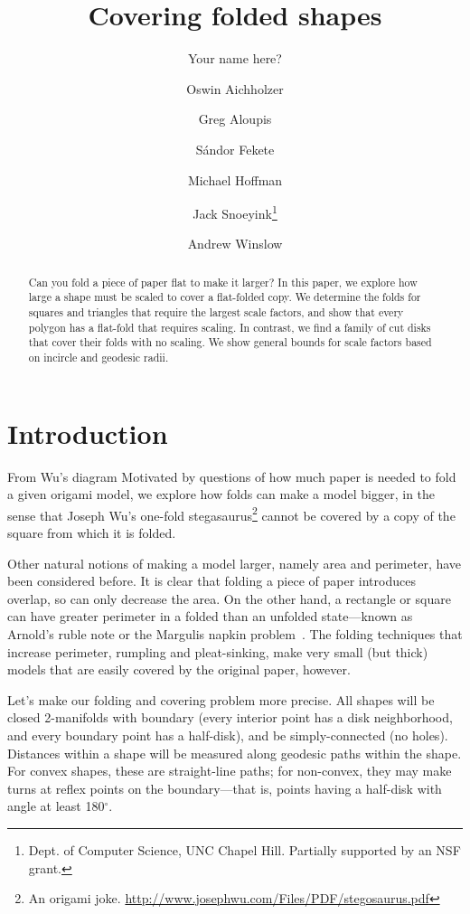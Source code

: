 \documentclass[11pt]{article}
\title{Covering folded shapes}
\author{
Your name here?\and
Oswin Aichholzer\and
Greg Aloupis\and
S\'andor Fekete\and
Michael Hoffman\and
Jack Snoeyink\thanks{
Dept. of Computer Science, UNC Chapel Hill. Partially supported by an
NSF grant.}\and
Andrew Winslow
}
\begin{document}
\maketitle
\begin{abstract}
Can you fold a piece of paper flat to make it larger? 
In this paper, we explore how large a shape must be scaled to cover a 
flat-folded copy.  We determine the folds for squares and triangles that require the
largest scale factors, and show that every polygon has a flat-fold that
requires scaling.  In contrast, we  find a
family of cut disks that cover their folds with no scaling. 
We show general bounds for scale factors based on incircle and geodesic radii.
\end{abstract}
\section{Introduction}

{From Wu's diagram}
Motivated by questions of how much paper is needed to fold a given origami model, 
we explore how folds can make a model bigger, in the sense that 
Joseph Wu's one-fold stegasaurus\footnote{An origami joke. 
\url{http://www.josephwu.com/Files/PDF/stegosaurus.pdf}}
cannot be covered by a copy of the square from which it is folded.

Other natural notions of making a model larger, namely area and perimeter,  
have been considered before.
It is clear that folding a piece of paper introduces overlap, so can
only decrease the area.  On the other hand, a rectangle or square can
have greater perimeter in a folded than an unfolded state---known 
as Arnold's ruble note or the Margulis napkin problem~\cite{a05,l03}. 
The folding techniques that increase perimeter, rumpling and
pleat-sinking, make very small (but thick)  models that are easily
covered by the original paper, however. 

Let's make our folding and covering problem more precise. 
All shapes will be closed 2-manifolds with
boundary (every interior point has a disk neighborhood, and every
boundary point has a half-disk), and be simply-connected (no holes). 
Distances within a shape will be measured along geodesic paths
within the shape.   For convex shapes, these are straight-line paths;
for non-convex, they may make turns at reflex points on the
boundary---that is, points having a half-disk with angle at least
180$^\circ$.  
\end{document}
